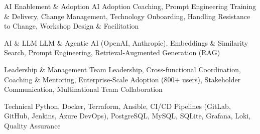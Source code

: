 
\begin{cvskills}

  \cvskill
    {AI Enablement \& Adoption} %
    {AI Adoption Coaching, Prompt Engineering Training \& Delivery, Change Management, Technology Onboarding, Handling Resistance to Change, Workshop Design \& Facilitation} %

  \cvskill
    {AI \& LLM} %
    {LLM \& Agentic AI (OpenAI, Anthropic), Embeddings \& Similarity Search, Prompt Engineering, Retrieval-Augmented Generation (RAG)} %

  \cvskill
    {Leadership \& Management} %
    {Team Leadership, Cross-functional Coordination, Coaching \& Mentoring, Enterprise-Scale Adoption (800+ users), Stakeholder Communication, Multinational Team Collaboration} %

  \cvskill
    {Technical} %
    {Python, Docker, Terraform, Ansible, CI/CD Pipelines (GitLab, GitHub, Jenkins, Azure DevOps), PostgreSQL, MySQL, SQLite, Grafana, Loki, Quality Assurance} %

\end{cvskills}
